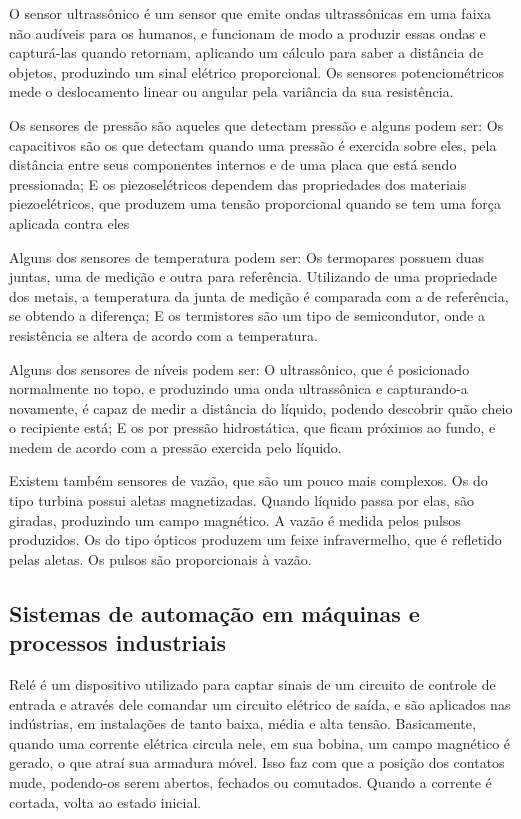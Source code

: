 \documentclass{article}
\begin{document}
O sensor ultrassônico é um sensor que emite ondas ultrassônicas em uma faixa não audíveis para os humanos, e funcionam de modo a produzir essas ondas e capturá-las quando retornam, aplicando um cálculo para saber a distância de objetos, produzindo	 um sinal elétrico proporcional. Os sensores potenciométricos mede o deslocamento linear ou angular pela variância da sua resistência. 

Os sensores de pressão são aqueles que detectam pressão e alguns podem ser: Os capacitivos são os que detectam quando uma pressão é exercida sobre eles, pela distância entre seus componentes internos e de uma placa que está sendo pressionada; E os piezoselétricos dependem das propriedades dos materiais piezoelétricos, que produzem uma tensão proporcional quando se tem uma força aplicada contra eles 

Alguns dos sensores de temperatura podem ser: Os termopares possuem duas juntas, uma de medição e outra para referência. Utilizando de uma propriedade dos metais, a temperatura da junta de medição é comparada com a de referência, se obtendo a diferença; E os termistores são um tipo de semicondutor, onde a resistência se altera de acordo com a temperatura. 

Alguns dos sensores de níveis podem ser: O ultrassônico, que é posicionado normalmente no topo, e produzindo uma onda ultrassônica e capturando-a novamente, é capaz de medir a distância do líquido, podendo descobrir quão cheio o recipiente está; E os por pressão hidrostática, que ficam próximos ao fundo, e medem de acordo com a pressão exercida pelo líquido. 

Existem também sensores de vazão, que são um pouco mais complexos. Os do tipo turbina possui aletas magnetizadas. Quando líquido passa por elas, são giradas, produzindo um campo magnético. A vazão é medida pelos pulsos produzidos. Os do tipo ópticos produzem um feixe infravermelho, que é refletido pelas aletas. Os pulsos são proporcionais à vazão. 

\subsection{Sistemas de automação em máquinas e processos
industriais}

Relé é um dispositivo utilizado para captar sinais de um circuito de controle de entrada e através dele comandar um circuito elétrico de saída, e são aplicados nas indústrias, em instalações de tanto baixa, média e alta tensão. Basicamente, quando uma corrente elétrica circula nele, em sua bobina, um campo magnético é gerado, o que atraí sua armadura móvel. Isso faz com que a posição dos contatos mude, podendo-os serem abertos, fechados ou comutados. Quando a corrente é cortada, volta ao estado inicial. 
\end{document}
